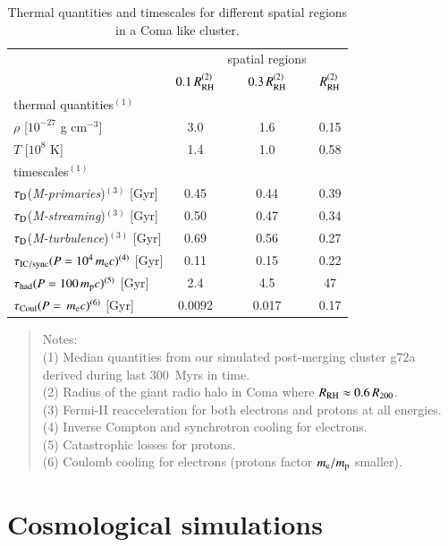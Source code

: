 \documentclass[fleqn,usenatbib,useAMS]{mnras}
\newcommand{\Mstream}{{\it M-streaming}\xspace}
\newcommand{\Mflatturb}{{\it M-turbulence}\xspace}
\newcommand{\Mprimary}{{\it M-primaries}\xspace}
\newcommand{\RH}{R_\rmn{RH}}
\begin{document}
\begin{table}
  \caption{Thermal quantities and timescales for different spatial
    regions in a Coma like cluster.}
\begin{tabular}{l c  c c}
\hline
\hline
& & spatial regions & \\
 & $0.1\,\RH^{(2)}$ & $0.3\,\RH^{(2)}$ & $\RH^{(2)}$   \\
\hline
thermal quantities$^{(1)}$ & & & \\
$\rho$ [$10^{-27}$ g cm$^{-3}$] & 3.0 & 1.6 & 0.15 \\
$T$ [$10^{8}$ K] & 1.4 & 1.0 & 0.58 \\
\hline
timescales$^{(1)}$ & & & \\
$\tau_{\mathrm{D}}$(\Mprimary)$^{(3)}$ [Gyr] & 0.45 & 0.44 & 0.39 \\
$\tau_{\mathrm{D}}$(\Mstream)$^{(3)}$  [Gyr] & 0.50 & 0.47 & 0.34 \\
$\tau_{\mathrm{D}}$(\Mflatturb)$^{(3)}$  [Gyr] & 0.69 & 0.56 & 0.27 \\
$\tau_{\mathrm{IC/sync}}(P=10^4\,m_{{\mathrm{e}}}c)^{(4)}$ [Gyr] & 0.11 & 0.15 & 0.22 \\
$\tau_{\mathrm{had}}(P=100\,m_{{\mathrm{p}}}c)^{(5)}$ [Gyr] & 2.4 & 4.5 & 47 \\
$\tau_{\mathrm{Coul}}(P=\,m_{{\mathrm{e}}}c)^{(6)}$  [Gyr] & 0.0092 & 0.017 & 0.17 \\
\hline
\end{tabular}
\begin{quote}
 Notes: \\ 
 (1) Median quantities from our simulated post-merging cluster g72a derived 
 during last 300~Myrs in time. \\
 (2) Radius of the giant radio halo in Coma where $\RH\approx0.6\,R_{200}$.\\
 (3) Fermi-II reacceleration for both electrons and protons at all energies.\\
 (4) Inverse Compton and synchrotron cooling for electrons.\\
 (5) Catastrophic losses for protons.\\
 (6) Coulomb cooling for electrons (protons factor $m_{{\mathrm{e}}}/m_{{\mathrm{p}}}$ smaller).\\
 \label{tab:timescales}
  \end{quote}
\end{table} 


\section{Cosmological simulations}
\label{sec:results}
\end{document}
